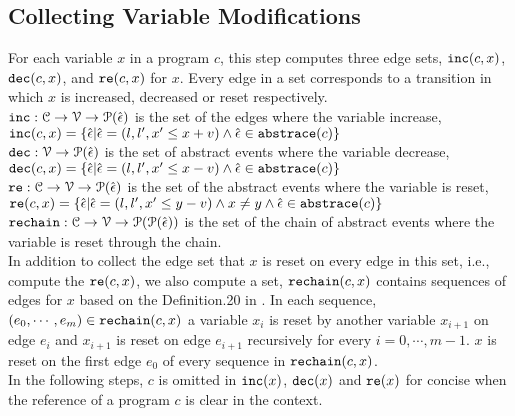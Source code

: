   \subsection{Collecting Variable Modifications}
  For each variable $x$ in a program $c$, this step computes three edge sets, $\mathtt{inc}(c, x)$, $\mathtt{dec}(c, x)$,
  and $\mathtt{re}(c, x)$ for $x$.
  Every edge in a set corresponds to a transition in which $x$ is increased,
  decreased
  or reset
  respectively.
  \\
  $\mathtt{inc}: \mathcal{C} \to \mathcal{V} \to \mathcal{P}(\hat{\mathtt{\epsilon}{}}) $
  is the set of the edges where the variable increase, 
  \\
  $\mathtt{inc}(c, x) = \{ \hat{\mathtt{\epsilon}{}} | \hat{\mathtt{\epsilon}{}} = (l, l', x' \leq x + v) \land \hat{\mathtt{\epsilon}{}} \in \mathtt{abs}{\mathtt{trace}}(c)\}$
  \\
  $\mathtt{dec}: \mathcal{V} \to \mathcal{P}(\hat{\mathtt{\epsilon}{}}) $
  is the set of abstract events where the variable decrease,
  \\
  $\mathtt{dec}(c, x) = \{\hat{\mathtt{\epsilon}{}}| \hat{\mathtt{\epsilon}{}} = (l, l', x' \leq x - v) \land \hat{\mathtt{\epsilon}{}} \in \mathtt{abs}{\mathtt{trace}}(c)\}$
  \\
  $\mathtt{re}: \mathcal{C} \to \mathcal{V} \to \mathcal{P}(\hat{\mathtt{\epsilon}{}}) $
  is the set of the abstract events where the variable is reset,
  \\
  $\mathtt{re}(c, x) = \{\hat{\mathtt{\epsilon}{}}| \hat{\mathtt{\epsilon}{}} = (l, l', x' \leq y - v) \land x \neq y \land \hat{\mathtt{\epsilon}{}} \in \mathtt{abs}{\mathtt{trace}}(c)\}$
  \\
  $\mathtt{rechain}: \mathcal{C} \to \mathcal{V} \to \mathcal{P}(\mathcal{P}(\hat{\mathtt{\epsilon}{}})) $
  is the set of the chain of abstract events where the variable is reset through the chain.
  \\
  In addition to
  collect the edge set that $x$ is reset on every edge in this set, i.e., compute the $\mathtt{re}(c, x)$,
  we also compute a set, $\mathtt{rechain}(c, x)$ contains sequences of edges for $x$
  based on the Definition.20 in \cite{sinn2017complexity}.
  In each sequence, $(e_0, \cdots, e_m) \in \mathtt{rechain}(c, x)$
  a variable $x_i$ is reset by another variable $x_{i + 1}$ on edge $e_{i}$
  and $x_{i + 1}$ is reset on edge $e_{i + 1}$ recursively
  for every $i = 0, \cdots, m - 1$.
  $x$ is reset on the first edge $e_0$ of every sequence in $\mathtt{rechain}(c, x)$.
  \\
  In the following steps, $c$ is omitted in $\mathtt{inc}(x)$,
  $\mathtt{dec}(x)$ and $\mathtt{re}(x)$ for concise when the reference of a program $c$ is clear in the context.

